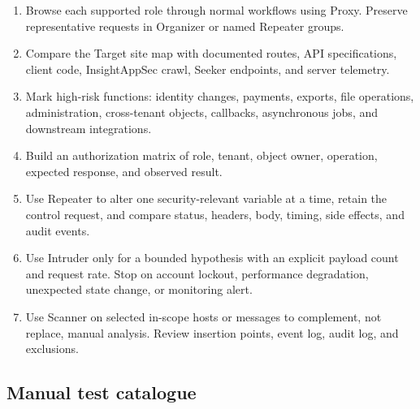 \documentclass[11pt,letterpaper]{article}
\begin{document}
\begin{enumerate}
  \item Browse each supported role through normal workflows using Proxy. Preserve representative requests in Organizer or named Repeater groups.
  \item Compare the Target site map with documented routes, API specifications, client code, InsightAppSec crawl, Seeker endpoints, and server telemetry.
  \item Mark high-risk functions: identity changes, payments, exports, file operations, administration, cross-tenant objects, callbacks, asynchronous jobs, and downstream integrations.
  \item Build an authorization matrix of role, tenant, object owner, operation, expected response, and observed result.
  \item Use Repeater to alter one security-relevant variable at a time, retain the control request, and compare status, headers, body, timing, side effects, and audit events.
  \item Use Intruder only for a bounded hypothesis with an explicit payload count and request rate. Stop on account lockout, performance degradation, unexpected state change, or monitoring alert.
  \item Use Scanner on selected in-scope hosts or messages to complement, not replace, manual analysis. Review insertion points, event log, audit log, and exclusions.
\end{enumerate}

\subsection{Manual test catalogue}
\end{document}
